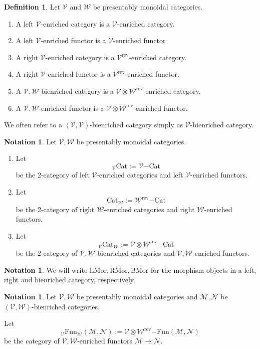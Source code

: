 \documentclass[10pt,oneside]{article}
\numberwithin{equation}{section} %
\numberwithin{figure}{section} %
\theoremstyle{plain}
\theoremstyle{definition}
\newtheorem{definition}[theorem]{Definition}
\newtheorem{notation}[theorem]{Notation}
\newcommand{\mM}{{\mathcal M}}
\newcommand{\mN}{{\mathcal N}}
\newcommand{\mV}{{\mathcal V}}
\newcommand{\mW}{{\mathcal W}}
\renewcommand{\L}{{\mathrm L}}
\newcommand{\R}{{\mathrm R}}
\newcommand{\rev}{{\mathrm{rev}}}
\newcommand{\ot}{\otimes}
\newcommand{\Cat}{\mathrm{Cat}}
\newcommand{\Fun}{\mathrm{Fun}}
\newcommand{\Mor}{{\mathrm{Mor}}}
\begin{document}
\begin{definition}\label{bienr}
Let $\mV$ and $\mW$ be presentably monoidal categories.	 
\begin{enumerate}[\normalfont(1)]\setlength{\itemsep}{-2pt}
\item A left $\mV$-enriched category is a $\mV$-enriched category.
\item A left $\mV$-enriched functor is a $\mV$-enriched functor
\item A right $\mV$-enriched category is a $\mV^\rev$-enriched category.
\item A right $\mV$-enriched functor is a $\mV^\rev$-enriched functor.
\item A $\mV,\mW$-bienriched category is a $\mV \ot \mW^\rev$-enriched category.
\item A $\mV,\mW$-enriched functor is a $\mV \ot \mW^\rev$-enriched functor.
\end{enumerate}
\end{definition}



We often refer to a $(\mV,\mV)$-bienriched category simply as $\mV$-bienriched category.

\begin{notation}
Let $\mV, \mW$ be presentably monoidal categories.
\begin{enumerate}[\normalfont(1)]\setlength{\itemsep}{-2pt}
\item Let $${_\mV \Cat}:= {\mV}\mathrm{-}\Cat$$
be the 2-category of left $\mV$-enriched categories and left $\mV$-enriched functors.
\item Let $${\Cat_\mW}:= {\mW^\rev}\mathrm{-}\Cat$$
be the 2-category of right $\mW$-enriched categories and right $\mW$-enriched functors.
\item Let $${_\mV \Cat_\mW}:= {\mV \ot \mW^\rev}\mathrm{-}\Cat$$
be the 2-category of $\mV,\mW$-bienriched categories and $\mV,\mW$-enriched functors.
\end{enumerate}
\end{notation}

\begin{notation}

We will write $\L\Mor, \R\Mor, \mathrm{B}\Mor$ for the morphism objects in a left, right and bienriched category, respectively.    
\end{notation}

\begin{notation}
Let $\mV, \mW$ be presentably monoidal categories and $\mM, \mN$ be $(\mV,\mW)$-bienriched categories.

Let $$_\mV\Fun_\mW(\mM,\mN):= {\mV \ot \mW^\rev \mathrm{-}\Fun(\mM,\mN)}$$ be the category of $\mV,\mW$-enriched functors $\mM \to \mN.$

\end{notation}
\end{document}
